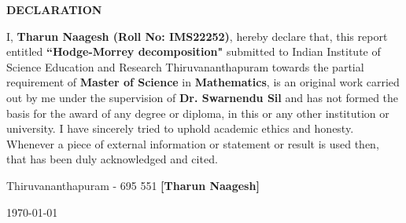 \begin{center}
  {\Large{\bf{DECLARATION}}}
\end{center}

\vspace{2em}

I, \textbf{Tharun Naagesh (Roll No: IMS22252)}, hereby declare that, this report entitled \textbf{``Hodge-Morrey decomposition"} submitted to Indian Institute of Science Education and Research Thiruvananthapuram towards the partial requirement of \textbf{Master of Science} in \textbf{Mathematics}, is an original work carried out by me under the supervision of \textbf{Dr. Swarnendu Sil} and has not formed the basis for the award of any degree or diploma, in this or any other institution or university. I have sincerely tried to uphold academic ethics and honesty. Whenever a piece of external information or statement or result is used then, that has been duly acknowledged and cited.

\vspace{3em} %

\noindent Thiruvananthapuram - 695 551 \hfill \textbf{[Tharun Naagesh]}

\noindent \today \hfill

\clearpage
